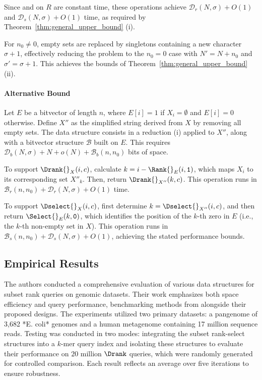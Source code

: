 \noindent Since \Rank{} and \Select{} on $R$ are constant time, these operations achieve $\mathcal{D}_r(N,\sigma) + O(1)$ and $\mathcal{D}_s(N,\sigma) + O(1)$ time, as required by Theorem~\ref{thm:general_upper_bound} (i).
\vspace{1em}

\noindent For $n_0 \neq 0$, empty sets are replaced by singletons containing a new character $\sigma + 1$, effectively reducing the problem to the $n_0 = 0$ case with $N' = N + n_0$ and $\sigma' = \sigma + 1$. This achieves the bounds of Theorem~\ref{thm:general_upper_bound} (ii).

\paragraph{Alternative Bound} Let $E$ be a bitvector of length $n$, where $E[i] = 1$ if $X_i = \emptyset$ and $E[i] = 0$ otherwise. Define $X''$ as the simplified string derived from $X$ by removing all empty sets. The data structure consists in a reduction (i) applied to $X''$, along with a bitvector structure $\mathcal{B}$ built on $E$. This requires $\mathcal{D}_b(N, \sigma) + N + o(N) + \mathcal{B}_b(n, n_0)$ bits of space. \vspace{1em}

\noindent To support $\Drank{}_X(i, c)$, calculate $k = i - \Rank{}_E(i, \texttt{1})$, which maps $X_i$ to its corresponding set $X''_{k}$. Then, return $\Drank{}_{X''}(k, c)$. This operation runs in $\mathcal{B}_r(n, n_0) + \mathcal{D}_r(N, \sigma) + O(1)$ time. \vspace{1em}

\noindent To support $\Dselect{}_X(i, c)$, first determine $k = \Dselect{}_{X''}(i, c)$, and then return $\Select{}_E(k, \texttt{0})$, which identifies the position of the $k$-th zero in $E$ (i.e., the $k$-th non-empty set in $X$). This operation runs in $\mathcal{B}_s(n, n_0) + \mathcal{D}_s(N, \sigma) + O(1)$, achieving the stated performance bounds.

\subsection{Empirical Results}
The authors conducted a comprehensive evaluation of various data structures for subset rank queries on genomic datasets. Their work emphasizes both space efficiency and query performance, benchmarking methods from \cite{SubsetWT} alongside their proposed designs. The experiments utilized two primary datasets: a pangenome of 3,682 *E. coli* genomes and a human metagenome containing 17 million sequence reads. Testing was conducted in two modes: integrating the subset rank-select structures into a $k$-mer query index and isolating these structures to evaluate their performance on $20$ million $\Drank$ queries, which were randomly generated for controlled comparison. Each result reflects an average over five iterations to ensure robustness. \vspace{1em}

